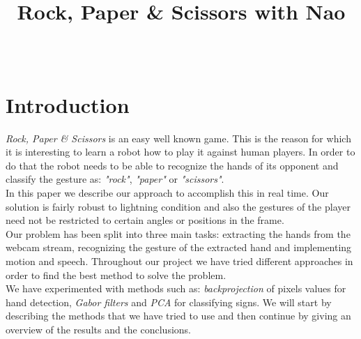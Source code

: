 \documentclass[a4paper, 11pt, twocolumn]{article}
\date{} %
\author{\fade{Nimrod Raiman [0336696]}\\\fade{Silvia L. Pintea [6109960]}}
\title{Rock, Paper \& Scissors with Nao}
\begin{document}
    \maketitle
	
    \section{Introduction}
	\label{sec:intro}
        \emph{Rock, Paper \& Scissors} is an easy well known game. This is the reason for which it is interesting to learn a robot how to play it against human players. In order to do that the robot needs to be able to recognize the hands of its opponent and classify the gesture as: \emph{"rock"}, \emph{"paper"} or \emph{"scissors"}.\\	
		\hspace*{10px}In this paper we describe our approach to accomplish this in real time. Our solution is fairly robust to lightning condition and also the gestures of the player need not be restricted to certain angles or positions in the frame.\\ 
        \hspace*{10px}Our problem has been split into three main tasks: extracting the hands from the webcam stream, recognizing the gesture of the extracted hand and implementing motion and speech. Throughout our project we have tried different approaches in order to find the best method to solve the problem.\\
		 \hspace*{10px}We have experimented with methods such as: \emph{backprojection} of pixels values for hand detection, \emph{Gabor filters} and \emph{PCA} for classifying signs. We will start by describing the methods that we have tried to use and then continue by giving an overview of the results and the conclusions.   
\end{document}
